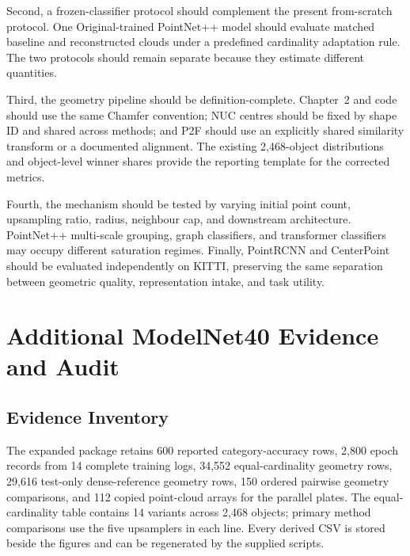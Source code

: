 Second, a frozen-classifier protocol should complement the present from-scratch protocol. One Original-trained PointNet++ model should evaluate matched baseline and reconstructed clouds under a predefined cardinality adaptation rule. The two protocols should remain separate because they estimate different quantities.

Third, the geometry pipeline should be definition-complete. Chapter~2 and code should use the same Chamfer convention; NUC centres should be fixed by shape ID and shared across methods; and P2F should use an explicitly shared similarity transform or a documented alignment. The existing 2,468-object distributions and object-level winner shares provide the reporting template for the corrected metrics.

Fourth, the mechanism should be tested by varying initial point count, upsampling ratio, radius, neighbour cap, and downstream architecture. PointNet++ multi-scale grouping, graph classifiers, and transformer classifiers may occupy different saturation regimes. Finally, PointRCNN and CenterPoint should be evaluated independently on KITTI, preserving the same separation between geometric quality, representation intake, and task utility.

\appendix
\setcounter{chapter}{2}
\chapter{Additional ModelNet40 Evidence and Audit}
\label{app:modelnet-evidence}

\section{Evidence Inventory}

The expanded package retains 600 reported category-accuracy rows, 2,800 epoch records from 14 complete training logs, 34,552 equal-cardinality geometry rows, 29,616 test-only dense-reference geometry rows, 150 ordered pairwise geometry comparisons, and 112 copied point-cloud arrays for the parallel plates. The equal-cardinality table contains 14 variants across 2,468 objects; primary method comparisons use the five upsamplers in each line. Every derived CSV is stored beside the figures and can be regenerated by the supplied scripts.

